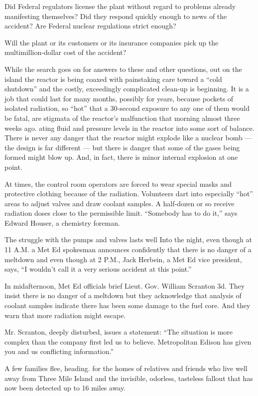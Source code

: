 Did Federal regulators license the plant without regard to problems
already manifesting themselves? Did they respond quickly enough to news
of the accident? Are Federal nuclear regulations strict enough?

Will the plant or its customers or its insurance companies pick up the
multimillion‐dollar cost of the accident?

While the search goes on for answers to these and other questions, out
on the island the reactor is being coaxed with painstaking care toward a
``cold shutdown'' and the costly, exceedingly complicated clean‐up is
beginning. It is a job that could last for many months, possibly for
years, because pockets of isolated radiation, so ``hot'' that a
30‐second exposure to any one of them would be fatal, are stigmata of
the reactor's malfunction that morning almost three weeks ago. ating
fluid and pressure levels in the reactor into some sort of balance.
There is never any danger that the reactor might explode like a nuclear
bomb --- the design is far different --- but there is danger that some
of the gases being formed might blow up. And, in fact, there is minor
internal explosion at one point.

At times, the control room operators are forced to wear special masks
and protective clothing because of the radiation. Volunteers dart into
especially ``hot'' areas to adjust valves and draw coolant samples. A
half‐dozen or so receive radiation doses close to the permissible limit.
``Somebody has to do it,'' says Edward Houser, a chemistry foreman.

The struggle with the pumps and valves lasts well Into the night, even
though at 11 A.M. a Met Ed spokesman announces confidently that there is
no danger of a meltdown and even though at 2 P.M., Jack Herbein, a Met
Ed vice president, says, ``I wouldn't call it a very serious accident at
this point.''

In midafternoon, Met Ed officials brief Lieut. Gov. William Scranton 3d.
They insist there is no danger of a meltdown but they acknowledge that
analysis of coolant samples indicate there has been some damage to the
fuel core. And they warn that more radiation might escape.

Mr. Scranton, deeply disturbed, issues a statement: ``The situation is
more complex than the company first led us to believe. Metropolitan
Edison has given you and us conflicting information.''

A few families flee, heading. for the homes of relatives and friends who
live well away from Three Mile Island and the invisible, odorless,
tasteless fallout that has now been detected up to 16 miles away.

